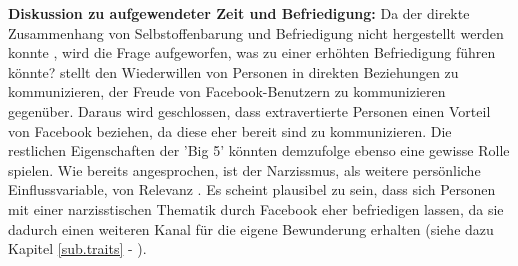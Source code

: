 \textbf{Diskussion zu aufgewendeter Zeit und Befriedigung:}\newline
Da der direkte Zusammenhang von Selbstoffenbarung und Befriedigung nicht hergestellt werden konnte \cite{Special:2012}, wird die Frage aufgeworfen, was zu einer erhöhten Befriedigung führen könnte?  stellt den Wiederwillen von Personen in direkten Beziehungen zu kommunizieren, der Freude von Facebook-Benutzern zu kommunizieren gegenüber. Daraus wird geschlossen, dass extravertierte Personen einen Vorteil von Facebook beziehen, da diese eher bereit sind zu kommunizieren. Die restlichen Eigenschaften der 'Big 5' könnten demzufolge ebenso eine gewisse Rolle spielen.\newline
Wie bereits angesprochen, ist der Narzissmus, als weitere persönliche Einflussvariable, von Relevanz \cite{Special:2012}. Es scheint plausibel zu sein, dass sich Personen mit einer narzisstischen Thematik durch Facebook eher befriedigen lassen, da sie dadurch einen weiteren Kanal für die eigene Bewunderung erhalten (siehe dazu Kapitel \ref{sub.traits} - ).\par 

